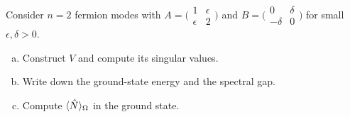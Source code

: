 \begin{exercise}\label{ex:fermion-diag}
  Consider $n = 2$ fermion modes with $A = \bigl(\begin{smallmatrix}
  1 & \epsilon \\ \epsilon & 2 \end{smallmatrix}\bigr)$ and $B =
  \bigl(\begin{smallmatrix} 0 & \delta \\ -\delta & 0
  \end{smallmatrix}\bigr)$ for small $\epsilon, \delta > 0$.
  \begin{enumerate}[(a)]
    \item Construct $V$ and compute its singular values.
    \item Write down the ground-state energy and the spectral gap.
    \item Compute $\langle \hat{N} \rangle_\Omega$ in the ground state.
  \end{enumerate}
\end{exercise}
